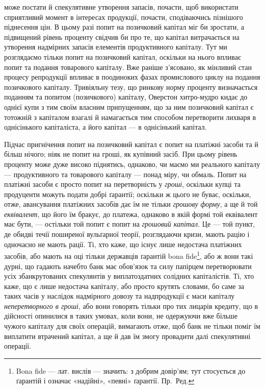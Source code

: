 \parcont{}  %
може постати й спекулятивне утворення запасів, почасти, щоб використати сприятливий
момент в інтересах продукції, почасти, сподіваючись пізнішого піднесення
цін. В цьому разі попит на позичковий капітал міг би зростати, а підвищений
рівень проценту свідчив би про те, що капітал витрачається на утворення
надмірних запасів елементів продуктивного капіталу. Тут ми розглядаємо
тільки попит на позичковий капітал, оскільки на нього впливає попит та
подання товарового капіталу. Вже раніше з’ясовано, як мінливий стан процесу
репродукції впливає в поодиноких фазах промислового циклу на подання позичкового
капіталу. Тривіяльну тезу, що ринкову норму проценту визначається
поданням та попитом (позичкового) капіталу, Оверстон хитро-мудро кидає до
однієї купи з тим своїм власним припущенням, що за ним позичковий капітал
є тотожній з капіталом взагалі й намагається тим способом перетворити лихваря
в однісінького капіталіста, а його капітал — в однісінький капітал.

Підчас пригнічення попит на позичковий капітал є попит на платіжні засоби
та й більш нічого; ніяк не попит на гроші, як купівний засіб. При цьому
рівень проценту може дуже високо піднятись, однаково, чи маємо ми реального
капіталу — продуктивного та товарового капіталу — понад міру, чи обмаль.
Попит на платіжні засоби є просто попит на перетворність у \emph{гроші}, оскільки
купці та продуценти можуть подати добрі ґарантії; оскільки ж цього не буває,
оскільки, отже, авансування платіжних засобів дає їм не тільки \emph{грошову}
\emph{форму}, а ще й той \emph{еквівалент}, що його їм бракує, до платежа, однаково в якій
формі той еквівалент має бути, — остільки той попит є попит на \emph{грошовий капітал}.
Це — той пункт, де обидві течії поширеної вульґарної теорії, розглядаючи
кризи, мають рацію і одночасно не мають рації. Ті, хто каже, що існує лише недостача
платіжних засобів, або мають на оці тільки державців ґарантій bona
fide\footnote{
Bona fide — лат. вислів — значить: з добрим довір’ям; тут стосується до ґарантій і означає
«надійні», «певні» ґарантії. Пр.~Ред.
}, або ж вони такі дурні, що гадають начебто банк має обов’язок та силу
папірцем перетворювати усіх збанкрутованих спекулянтів у виплатоздатних солідних
капіталістів. Ті, хто каже, що є лише недостача капіталу, або просто
крутять словами, бо саме за таких часів у наслідок надмірного довозу та надпродукції
є маси капіталу \emph{неперетворного в гроші}, або вони говорять тільки
про тих лицарів кредиту, що в дійсності опинилися в таких умовах, коли вони,
не одержуючи вже більше чужого капіталу для своїх операцій, вимагають
отже, щоб банк не тільки поміг їм виплатити втрачений капітал, а ще й дав
їм змогу провадити далі спекулятивні операції.

